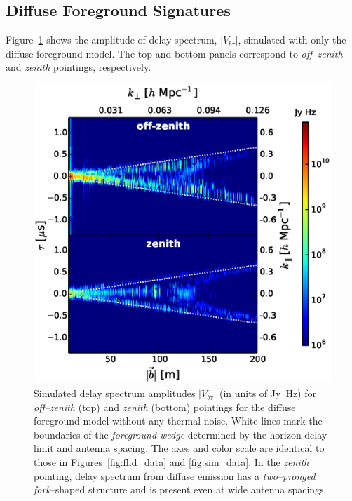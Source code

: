 \documentclass[preprint2,iop,numberedappendix]{emulateapj}
\begin{document}
\subsection{Diffuse Foreground Signatures}\label{sec:diffuse}

Figure~\ref{fig:noiseless-dsm-delay-spectrum} shows the amplitude of delay spectrum, $|V_{b\tau}|$, simulated with only the diffuse foreground model. The top and bottom panels correspond to {\it off--zenith} and {\it zenith} pointings, respectively. 

\begin{figure}[htb]
\centering
\includegraphics[width=\linewidth]{f8.eps}
\caption{Simulated delay spectrum amplitudes $|V_{b\tau}|$ (in units of Jy~Hz) for {\it off--zenith} (top) and {\it zenith} (bottom) pointings for the diffuse foreground model without any thermal noise. White lines mark the boundaries of the {\it foreground wedge} determined by the horizon delay limit and antenna spacing. The axes and color scale are identical to those in Figures~\ref{fig:fhd_data} and \ref{fig:sim_data}. In the {\it zenith} pointing, delay spectrum from diffuse emission has a {\it two--pronged fork}--shaped structure and is present even at wide antenna spacings. \label{fig:noiseless-dsm-delay-spectrum}}
\end{figure}
\end{document}
